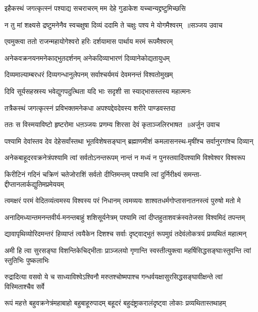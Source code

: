 \twolineshloka
{इहैकस्थं जगत्कृत्स्नं पश्याद्य सचराचरम्}
{मम देहे गुडाकेश यच्चान्यद्द्रष्टुमिच्छसि}


\threelineshloka
{न तु मां शक्ष्यसे द्रष्टुमनेनैव स्वचक्षुषा}
{दिव्यं ददामि ते चक्षुः पश्य मे योगमैश्वरम् ॥सञ्जय उवाच}
{}


\twolineshloka
{एवमुक्त्वा ततो राजन्महायोगेश्वरो हरिः}
{दर्शयामास पार्थाय मरमं रूपमैश्वरम्}


\twolineshloka
{अनेकवक्रनयनमनेकाद्भुतदर्शनम्}
{अनेकदिव्याभारणं दिव्यानेकोद्यतायुधम्}


\twolineshloka
{दिव्यमाल्याम्बरधरं दिव्यगन्धानुलेपनम्}
{सर्वाश्चर्यमयं देवमनन्तं विश्वतोमुखम्}


\twolineshloka
{दिवि सूर्यसहस्रस्य भवेद्युगपदुत्थिता}
{यदि भाः सदृशी सा स्याद्भासस्तस्य महात्मनः}


\twolineshloka
{तत्रैकस्थं जगत्कृत्स्नं प्रविभक्तमनेकधा}
{अपश्यद्देवदेवस्य शरीरे पाण्डवस्तदा}


\threelineshloka
{ततः स विस्मयाविष्टो हृष्टरोमा धऩञ्जयः}
{प्रणम्य शिरसा देवं कृताञ्जलिरभाषत ॥अर्जुन उवाच}
{}


\twolineshloka
{पश्यामि देवांस्तव देव देहेसर्वांस्तथा भूतविशेषसङ्घान्}
{ब्रह्माणमीशं कमलासनस्थ-मृषींश्च सर्वानुरगांश्च दिव्यान्}


\twolineshloka
{अनेकबाहूदरवक्रनेत्रंपश्यामि त्वां सर्वतोऽनन्तरूपम्}
{नान्तं न मध्यं न पुनस्तवादिंपश्यामि विश्वेश्वर विश्वरूप}


\twolineshloka
{किरीटिनं गदिनं चक्रिणं चतेजोराशिं सर्वतो दीप्तिमन्तम्}
{पश्यामि त्वां दुर्निरीक्ष्यं समन्ता-द्दीप्तानलार्कद्युतिमप्रमेययम्}


\twolineshloka
{त्वमक्षरं परमं वेदितव्यंत्वमस्य विश्वस्य परं निधानम्}
{त्वमव्ययः शाश्वतधर्मगोप्तासनातनस्त्वं पुरुषो मतो मे}


\twolineshloka
{अनादिमध्यान्तमनन्तवीर्य-मनन्तबाहुं शशिसूर्यनेत्रम्}
{पश्यामि त्वां दीप्तहुताशवक्रंस्वतेजसा विश्वमिदं तपन्तम्}


\twolineshloka
{द्यावापृथिव्योरिदमन्तरं हिव्याप्तं त्वयैकेन दिशश्च सर्वाः}
{दृष्ट्वाद्भुतं रूपमुग्रं तदेवंलोकत्रयं प्रव्यथितं महात्मन्}


\twolineshloka
{अमी हि त्वा सुरसङ्घा विशन्तिकेचिद्भीताः प्राञ्जलयो गृणान्ति}
{स्वस्तीत्युक्त्वा महर्षिसिद्धसङ्घाःस्तुवन्ति त्वां स्तुतिभिः पुष्कलाभिः}


\twolineshloka
{रुद्रादित्या वसवो ये च साध्याविश्वेऽश्विनौ मरुतश्चोष्मपाश्च}
{गन्धर्वयक्षासुरसिद्धसङ्घावीक्षन्ते त्वां विस्मिताश्चैव सर्वे}


\twolineshloka
{रूपं महत्ते बहुवक्रनेत्रंमहाबाहो बहुबाहूरुपादम्}
{बहूदरं बहुदंष्ट्राकरालंदृष्ट्वा लोकाः प्रव्यथितास्तथाहम्}


